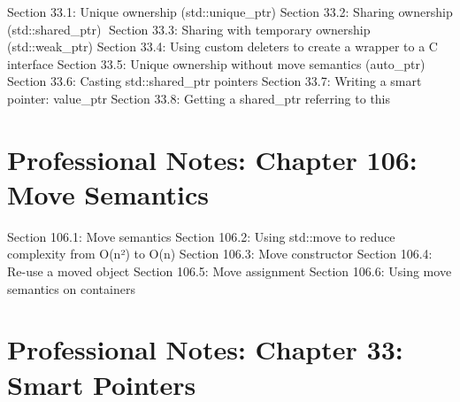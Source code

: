 Section 33.1: Unique ownership (std::unique\_ptr) Section 33.2: Sharing
ownership (std::shared\_ptr) Section 33.3: Sharing with temporary
ownership (std::weak\_ptr) Section 33.4: Using custom deleters to create
a wrapper to a C interface Section 33.5: Unique ownership without move
semantics (auto\_ptr) Section 33.6: Casting std::shared\_ptr pointers
Section 33.7: Writing a smart pointer: value\_ptr Section 33.8: Getting
a shared\_ptr referring to this

\hypertarget{professional-notes-chapter-106-move-semantics}{%
\chapter{Professional Notes: Chapter 106: Move
Semantics}\label{professional-notes-chapter-106-move-semantics}}

Section 106.1: Move semantics Section 106.2: Using std::move to reduce
complexity from O(n²) to O(n) Section 106.3: Move constructor Section
106.4: Re-use a moved object Section 106.5: Move assignment Section
106.6: Using move semantics on containers

\hypertarget{professional-notes-chapter-33-smart-pointers-1}{%
\chapter{Professional Notes: Chapter 33: Smart
Pointers}\label{professional-notes-chapter-33-smart-pointers-1}}

